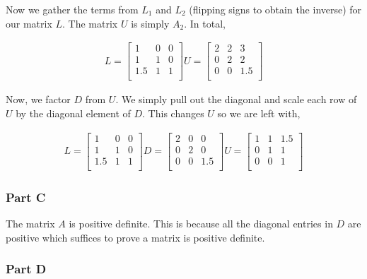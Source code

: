 Now we gather the terms from \(L_1\) and \(L_2\) (flipping signs to obtain the inverse) for our matrix \(L\).
The matrix \(U\) is simply \(A_2\).
In total,

\begin{eqnarray}
  L =
  \begin{bmatrix}
    1 & 0 & 0 \\
    1 & 1 & 0 \\
    1.5 & 1 & 1 \\
  \end{bmatrix}
  U =
  \begin{bmatrix}
    2 & 2 & 3 \\
    0 & 2 & 2 \\
    0 & 0 & 1.5 \\
  \end{bmatrix}
\end{eqnarray}

Now, we factor \(D\) from \(U\).
We simply pull out the diagonal and scale each row of \(U\) by the diagonal element of \(D\).
This changes \(U\) so we are left with,

\begin{eqnarray}
  L =
  \begin{bmatrix}
    1 & 0 & 0 \\
    1 & 1 & 0 \\
    1.5 & 1 & 1 \\
  \end{bmatrix}
  D =
  \begin{bmatrix}
    2 & 0 & 0 \\
    0 & 2 & 0 \\
    0 & 0 & 1.5 \\
  \end{bmatrix}
  U =
  \begin{bmatrix}
    1 & 1 & 1.5 \\
    0 & 1 & 1 \\
    0 & 0 & 1 \\
  \end{bmatrix}
\end{eqnarray}

\subsubsection{Part C}

The matrix \(A\) is positive definite.
This is because all the diagonal entries in \(D\) are positive which suffices to prove a matrix is positive definite.

\subsubsection{Part D}

